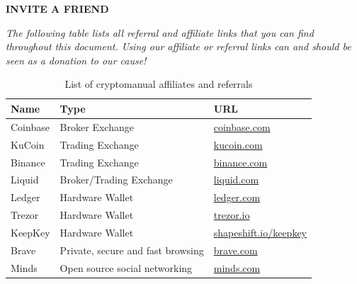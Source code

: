     \begin{cryptobox}{\textbf{INVITE A FRIEND}}

    \textit{The following table lists all referral and affiliate links that you can find throughout this document. Using our affiliate or referral links can and should be seen as a donation to our cause!}
    
    \tcblower
    
    
    \begin{table}[H]
    \centering
    \caption{List of cryptomanual affiliates and referrals}
    \begin{tabular}{lll} 
    \toprule
    
    \textbf{Name} & \textbf{Type }  & \textbf{URL}\\
    \midrule
    
    Coinbase & Broker Exchange & \href{https://www.coinbase.com/join/51954a2b26a1bcc484000015}{coinbase.com} \\
    KuCoin   &  Trading Exchange & \href{https://www.kucoin.com/#/?r=aNuPeb}{kucoin.com} \\
    Binance  &  Trading Exchange& \href{https://www.binance.com/?ref=35602166}{binance.com} \\
    Liquid   &  Broker/Trading Exchange & \href{https://www.liquid.com?affiliate=nUfQhVL4164547}{liquid.com} \\
    Ledger & Hardware Wallet & \href{https://shop.ledger.com/pages/ledger-nano-x?r=1849e3ffabd0}{ledger.com} \\
    Trezor & Hardware Wallet &\href{https://shop.trezor.io/?offer_id=10&aff_id=3118&source=cryptomanual}{trezor.io} \\
    KeepKey & Hardware Wallet &\href{https://shapeshift.io/keepkey/}{shapeshift.io/keepkey} \\
                               
    Brave & Private, secure and fast browsing & \href{https://brave.com/urm569}{brave.com} \\
    Minds & Open source social networking & \href{https://www.minds.com/register?referrer=cryptomanuals}{minds.com} \\
    
    \end{tabular}
    \label{tab:exchange_affiliates}
    \end{table}

\end{cryptobox}
	

